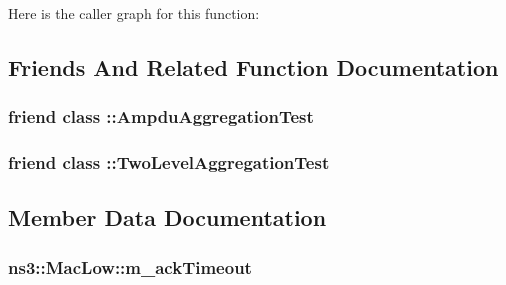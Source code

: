 Here is the caller graph for this function\+:




\subsection{Friends And Related Function Documentation}
\subsubsection[{\texorpdfstring{\+::\+Ampdu\+Aggregation\+Test}{::AmpduAggregationTest}}]{\setlength{\rightskip}{0pt plus 5cm}friend class \+::{\bf Ampdu\+Aggregation\+Test}\hspace{0.3cm}{\ttfamily [friend]}}\hypertarget{classns3_1_1MacLow_ac40416d983d6f5074b1f4d2d84900b75}{}\label{classns3_1_1MacLow_ac40416d983d6f5074b1f4d2d84900b75}
\subsubsection[{\texorpdfstring{\+::\+Two\+Level\+Aggregation\+Test}{::TwoLevelAggregationTest}}]{\setlength{\rightskip}{0pt plus 5cm}friend class \+::{\bf Two\+Level\+Aggregation\+Test}\hspace{0.3cm}{\ttfamily [friend]}}\hypertarget{classns3_1_1MacLow_a59c458327e669c30a9ba73441c96c03e}{}\label{classns3_1_1MacLow_a59c458327e669c30a9ba73441c96c03e}


\subsection{Member Data Documentation}
\subsubsection[{\texorpdfstring{m\+\_\+ack\+Timeout}{m_ackTimeout}}]{ ns3\+::\+Mac\+Low\+::m\+\_\+ack\+Timeout\hspace{0.3cm}{\ttfamily [private]}}\hypertarget{classns3_1_1MacLow_a5889cbf3ea77554b9eb0cf1a618a2db8}{}\label{classns3_1_1MacLow_a5889cbf3ea77554b9eb0cf1a618a2db8}


